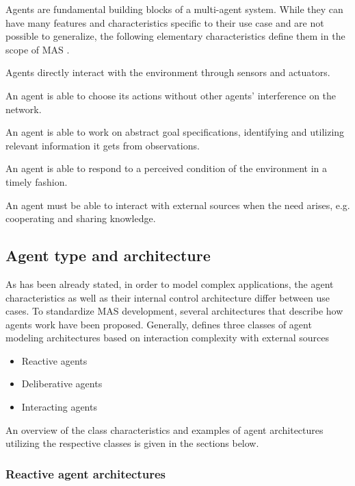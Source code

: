 \documentclass[0main.tex]{subfiles}
\begin{document}
Agents are fundamental building blocks of a multi-agent system. While they can have many
features and characteristics specific to their use case and are not possible to generalize,
the following elementary characteristics define them in the scope of MAS \cite{ParasumannaGokulan2010}.

Agents directly interact with the environment through sensors and actuators. 

An agent is able to choose its actions without other agents' interference on the network.

An agent is able to work on abstract goal specifications, identifying and utilizing relevant information it gets from observations.

An agent is able to respond to a perceived condition of the environment in a timely fashion.

An agent must be able to interact with external sources when the need arises, e.g. cooperating
and sharing knowledge.

\subsection{Agent type and architecture}

As has been already stated, in order to model complex applications, the agent characteristics
as well as their internal control architecture differ between use cases. To standardize
MAS development, several architectures that describe how agents work have been proposed.
Generally, \cite{Anthony2014} defines three classes of agent modeling architectures based on
interaction complexity with external sources 

\begin{itemize}
    \item Reactive agents
    \item Deliberative agents
    \item Interacting agents
\end{itemize}

An overview of the class characteristics and examples of agent architectures utilizing
the respective classes is given in the sections below.

\subsubsection{Reactive agent architectures}
\end{document}
